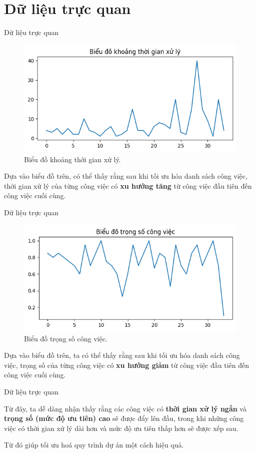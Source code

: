 \documentclass[10pt]{beamer}
\begin{document}
\section*{Dữ liệu trực quan}

\begin{frame}{Dữ liệu trực quan}
\begin{figure}[h]
\centering
\includegraphics[width=0.7\linewidth]{output_project_p.png}
\caption{Biểu đồ khoảng thời gian xử lý.}
\end{figure}

Dựa vào biểu đồ trên, có thể thấy rằng sau khi tối ưu hóa danh sách công việc, thời gian xử lý của từng công việc có \textbf{xu hướng tăng} từ công việc đầu tiên đến công việc cuối cùng.
\end{frame}

\begin{frame}{Dữ liệu trực quan}
\begin{figure}[h]
\centering
\includegraphics[width=0.7\linewidth]{output_project_w.png}
\caption{Biểu đồ trọng số công việc.}
\end{figure}

Dựa vào biểu đồ trên, ta có thể thấy rằng sau khi tối ưu hóa danh sách công việc, trọng số của từng công việc có \textbf{xu hướng giảm} từ công việc đầu tiên đến công việc cuối cùng.
\end{frame}

\begin{frame}{Dữ liệu trực quan}

Từ đây, ta dễ dàng nhận thấy rằng các công việc có \textbf{thời gian xử lý ngắn} và \textbf{trọng số (mức độ ưu tiên) cao} sẽ được đẩy lên đầu, trong khi những công việc có thời gian xử lý dài hơn và mức độ ưu tiên thấp hơn sẽ được xếp sau.

Từ đó giúp tối ưu hoá quy trình dự án một cách hiệu quả.
\end{frame}



\begin{frame}
    \nocite{*}
    \printbibliography
\end{frame}


\begin{frame}
    \begin{block}{}
    \medskip
    \center{\huge \it \textcolor[rgb]{0.37, 0.150, 0.190}{Thanks for listening!}}
    \medskip
    \end{block}	
\end{frame}    
\end{document}
